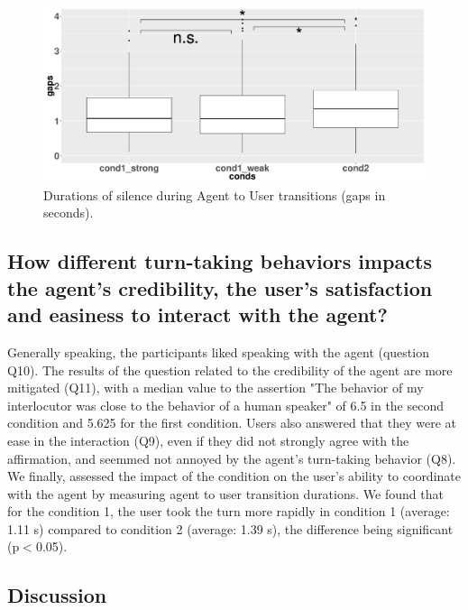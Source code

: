 \begin{figure}
\centering
\includegraphics[width=\linewidth]{figure/boxTransitionsAU.pdf}
\caption{Durations of silence during Agent to User transitions (gaps in seconds).}
\label{box_au}
\end{figure}

\subsection{How different turn-taking behaviors impacts the agent's credibility, the user's satisfaction and easiness to interact with the agent?}

Generally speaking, the participants liked speaking with the agent (question Q10). The results of the question related to the credibility of the agent are more mitigated (Q11), with a median value to the assertion "The behavior of my interlocutor was close to the behavior of a human speaker" of 6.5 in the second condition and 5.625 for the first condition. Users also answered that they were at ease in the interaction (Q9), even if they did not strongly agree with the affirmation, and seemmed not annoyed by the agent's turn-taking behavior (Q8). 
We finally, assessed the impact of the condition on the user's ability to coordinate with the agent by measuring agent to user transition durations. We found that for the condition 1, the user took the turn more rapidly in condition 1 (average: 1.11 s) compared to condition 2 (average: 1.39 s), the difference being significant (p$<$0.05). 


\subsection{Discussion}

